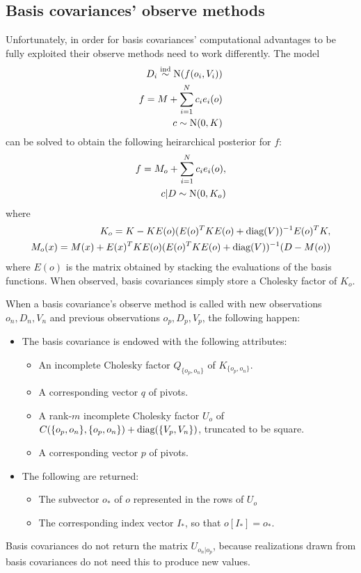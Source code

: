 \documentclass{report}
\begin{document}
\subsection{Basis covariances' observe methods}
Unfortunately, in order for basis covariances' computational advantages to be fully exploited their observe methods need to work differently. The model
\begin{eqnarray*}
    D_i \stackrel{\tiny{\textup{ind}}}{\sim} \textup{N}(f(o_i, V_i))\\
    f = M + \sum_{i=1}^N c_i e_i(o)\\
    c \sim \textup{N}(0, K)
\end{eqnarray*}
can be solved to obtain the following heirarchical posterior for $f$:
\begin{eqnarray*}
    f = M_o + \sum_{i=1}^N c_i e_i(o),\\
    c|D \sim \textup{N}(0, K_o)
\end{eqnarray*}
where
\begin{eqnarray*}
    K_o = K - KE(o)(E(o)^TKE(o) + \textup{diag}(V))^{-1}E(o)^TK,\\
    M_o(x) = M(x) + E(x)^TKE(o)(E(o)^TKE(o) + \textup{diag}(V))^{-1}(D-M(o))
\end{eqnarray*}
where $E(o)$ is the matrix obtained by stacking the evaluations of the basis functions. When observed, basis covariances simply store a Cholesky factor of $K_o$.

\bigskip
When a basis covariance's observe method is called with new observations $o_n, D_n, V_n$ and previous observations $o_p, D_p, V_p$, the following happen:
\begin{itemize}
    \item The basis covariance is endowed with the following attributes:
    \begin{itemize}
        \item An incomplete Cholesky factor  $Q_{\{o_p,o_n\}}$ of $K_{\{o_p,o_n\}}$.
        \item A corresponding vector $q$ of pivots.
        \item A rank-$m$ incomplete Cholesky factor $U_o$ of $C(\{o_p, o_n\}, \{o_p, o_n\}) + \textup{diag}(\{V_p, V_n\})$, truncated to be square.
        \item A corresponding vector $p$ of pivots.
    \end{itemize}
    \item The following are returned:
    \begin{itemize}
        \item The subvector $o_*$ of $o$ represented in the rows of $U_o$
        \item The corresponding index vector $I_*$, so that $o[{I_*}] = o_*$.
    \end{itemize}
\end{itemize}
Basis covariances do not return the matrix $U_{o_n|o_p}$, because realizations drawn from basis covariances do not need this to produce new values.
\end{document}
